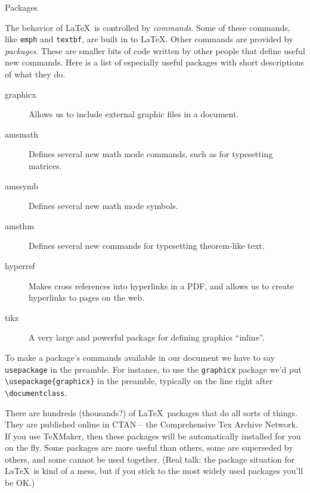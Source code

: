 \documentclass{article}
\begin{document}
\begin{center}
\Large Packages
\end{center}

The behavior of \LaTeX\ is controlled by \emph{commands}. Some of these commands, like \texttt{emph} and \texttt{textbf}, are built in to \LaTeX. Other commands are provided by \emph{packages}. These are smaller bits of code written by other people that define useful new commands. Here is a list of especially useful packages with short descriptions of what they do.

\begin{description}
\item[graphicx] Allows us to include external graphic files in a document.
\item[amsmath] Defines several new math mode commands, such as for typesetting matrices.
\item[amssymb] Defines several new math mode symbols.
\item[amsthm] Defines several new commands for typesetting theorem-like text.
\item[hyperref] Makes cross references into hyperlinks in a PDF, and allows us to create hyperlinks to pages on the web.
\item[tikz] A very large and powerful package for defining graphics ``inline''.
\end{description}

To make a package's commands available in our document we have to say \texttt{usepackage} in the preamble. For instance, to use the \texttt{graphicx} package we'd put \verb|\usepackage{graphicx}| in the preamble, typically on the line right after \verb|\documentclass|.

There are hundreds (thousands?) of \LaTeX\ packages that do all sorts of things. They are published online in CTAN -- the Comprehensive Tex Archive Network. If you use \TeX{}Maker, then these packages will be automatically installed for you on the fly. Some packages are more useful than others, some are superseded by others, and some cannot be used together. (Real talk: the package situation for \LaTeX\ is kind of a mess, but if you stick to the most widely used packages you'll be OK.)
\end{document}
